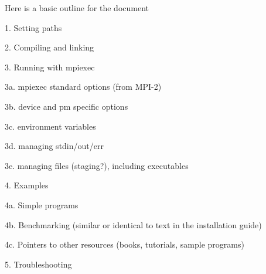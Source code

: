 \documentclass[dvipdfm,11pt]{article}
\begin{document}
Here is a basic outline for the document

1. Setting paths

2. Compiling and linking

3. Running with mpiexec

  3a. mpiexec standard options (from MPI-2)

  3b. device and pm specific options

  3c. environment variables

  3d. managing stdin/out/err

  3e. managing files (staging?), including executables

4. Examples 

   4a. Simple programs
  
   4b. Benchmarking (similar or identical to text in the installation guide)

   4c. Pointers to other resources (books, tutorials, sample programs)

5. Troubleshooting
\end{document}
